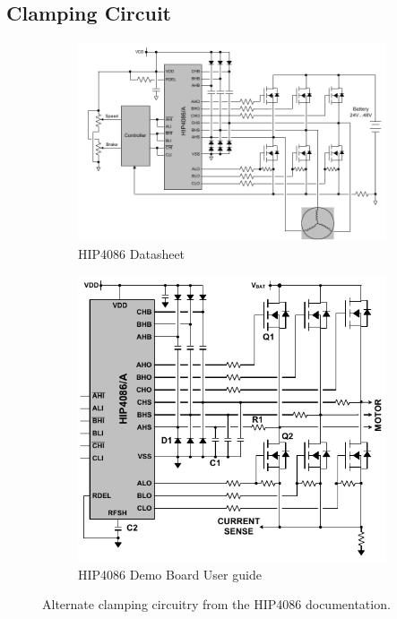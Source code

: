 \documentclass{article}
\begin{document}
\subsection{Clamping Circuit}
\begin{figure}[h]
	\centering
	\begin{subfigure}{0.5\textwidth}
		\includegraphics[width=\textwidth]{clamp1}
		\caption{HIP4086 Datasheet}
	\end{subfigure}
	\quad
	\begin{subfigure}{0.35\textwidth}
		\includegraphics[width=\textwidth]{clamp2}
		\caption{HIP4086 Demo Board User guide}
	\end{subfigure}
	\caption{Alternate clamping circuitry from the HIP4086 documentation\protect\footnotemark.}
	\label{fig:commutation}
\end{figure}
\end{document}
